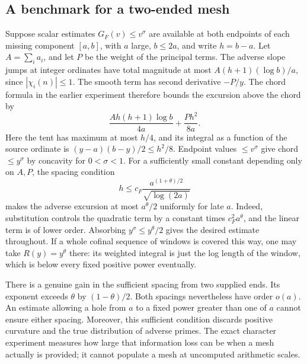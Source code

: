 \documentclass[12pt,letterpaper]{article}
\begin{document}
\subsection{A benchmark for a two-ended mesh}
Suppose scalar estimates \(G_F(v)\le v^\sigma\) are available at both endpoints of each missing component \([a,b]\), with \(a\) large, \(b\le2a\), and write \(h=b-a\). Let \(A=\sum_i a_i\), and let \(P\) be the weight of the principal terms. The adverse slope jumps at integer ordinates have total magnitude at most \(A(h+1)(\log b)/a\), since \(|\chi_i(n)|\le1\). The smooth term has second derivative \(-P/y\). The chord formula in the earlier experiment therefore bounds the excursion above the chord by
\[
 \frac{A h(h+1)\log b}{4a}+\frac{P h^2}{8a}.
\]
Here the tent has maximum at most \(h/4\), and its integral as a function of the source ordinate is \((y-a)(b-y)/2\le h^2/8\). Endpoint values \(\le v^\sigma\) give chord \(\le y^\sigma\) by concavity for \(0<\sigma<1\). For a sufficiently small constant depending only on \(A,P\), the spacing condition
\begin{equation}\label{eq:spacing}
 h\le c_F\frac{a^{(1+\theta)/2}}{\sqrt{\log(2a)}}
\end{equation}
makes the adverse excursion at most \(a^\theta/2\) uniformly for late \(a\). Indeed, substitution controls the quadratic term by a constant times \(c_F^2 a^\theta\), and the linear term is of lower order. Absorbing \(y^\sigma\le y^\theta/2\) gives the desired estimate throughout. If a whole cofinal sequence of windows is covered this way, one may take \(R(y)=y^\theta\) there: its weighted integral is just the log length of the window, which is below every fixed positive power eventually.

There is a genuine gain in the sufficient spacing from two supplied ends. Its exponent exceeds \(\theta\) by \((1-\theta)/2\). Both spacings nevertheless have order \(o(a)\). An estimate allowing a hole from \(a\) to a fixed power greater than one of \(a\) cannot ensure either spacing. Moreover, this sufficient condition discards positive curvature and the true distribution of adverse primes. The exact character experiment measures how large that information loss can be when a mesh actually is provided; it cannot populate a mesh at uncomputed arithmetic scales.
\end{document}
